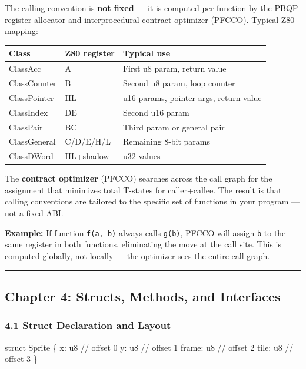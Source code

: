 \documentclass[
  11pt,
  a4paper,
]{report}
\newenvironment{Shaded}{\begin{snugshade}\small}{\end{snugshade}}
\newcommand{\NormalTok}[1]{#1}
\begin{document}
The calling convention is \textbf{not fixed} --- it is computed per
function by the PBQP register allocator and interprocedural contract
optimizer (PFCCO). Typical Z80 mapping:

\begin{longtable}[]{@{}lll@{}}
\toprule\noalign{}
Class & Z80 register & Typical use \\
\midrule\noalign{}
\endhead
\bottomrule\noalign{}
\endlastfoot
ClassAcc & A & First u8 param, return value \\
ClassCounter & B & Second u8 param, loop counter \\
ClassPointer & HL & u16 params, pointer args, return value \\
ClassIndex & DE & Second u16 param \\
ClassPair & BC & Third param or general pair \\
ClassGeneral & C/D/E/H/L & Remaining 8-bit params \\
ClassDWord & HL+shadow & u32 values \\
\end{longtable}

The \textbf{contract optimizer} (PFCCO) searches across the call graph
for the assignment that minimizes total T-states for caller+callee. The
result is that calling conventions are tailored to the specific set of
functions in your program --- not a fixed ABI.

\textbf{Example:} If function \texttt{f(a,\ b)} always calls
\texttt{g(b)}, PFCCO will assign \texttt{b} to the same register in both
functions, eliminating the move at the call site. This is computed
globally, not locally --- the optimizer sees the entire call graph.

\begin{center}\rule{0.5\linewidth}{0.5pt}\end{center}

\subsection{Chapter 4: Structs, Methods, and
Interfaces}\label{chapter-4-structs-methods-and-interfaces}

\subsubsection{4.1 Struct Declaration and
Layout}\label{struct-declaration-and-layout}

\begin{Shaded}
\begin{Highlighting}[]
\NormalTok{struct Sprite \{}
\NormalTok{    x: u8       // offset 0}
\NormalTok{    y: u8       // offset 1}
\NormalTok{    frame: u8   // offset 2}
\NormalTok{    tile: u8    // offset 3}
\NormalTok{\}}
\end{Highlighting}
\end{Shaded}
\end{document}

